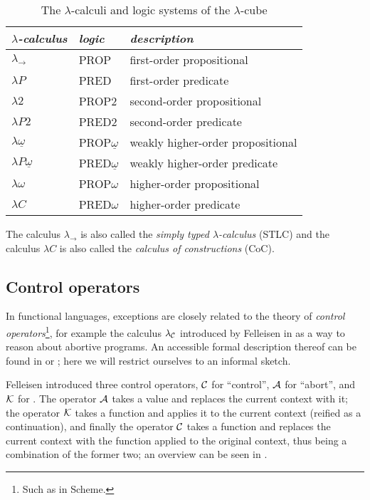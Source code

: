 \begin{table}
\centering
\begin{tabular}{lll}
\toprule
\textit{$\lambda$-calculus} & \textit{logic} & \textit{description} \\
\midrule
$\lambda_\to$ & PROP & first-order propositional \\
$\lambda{}P$ & PRED & first-order predicate \\
$\lambda{}2$ & PROP2 & second-order propositional \\
$\lambda{}P2$ & PRED2 & second-order predicate \\
$\lambda\underline{\omega}$ & PROP$\underline{\omega}$ & weakly higher-order propositional \\
$\lambda{}P\underline{\omega}$& PRED$\underline{\omega}$ & weakly higher-order predicate \\
$\lambda\omega$ & PROP$\omega$ & higher-order propositional \\
$\lambda{}C$ & PRED$\omega$ & higher-order predicate \\
\bottomrule
\end{tabular}

\vspace{6pt}
{\small The calculus $\lambda_\to$ is also called the \emph{simply typed $\lambda$-calculus} (STLC)
and the calculus $\lambda{}C$ is also called the \emph{calculus of constructions} (CoC).}
\caption{The $\lambda$-calculi and logic systems of the $\lambda$-cube \cite{barendregt91}}
\label{tab:lambda-cube}
\end{table}


\subsection{Control operators}

In functional languages, exceptions are closely related to the theory of
\emph{control operators}\footnote{Such as  in Scheme.},
for example the calculus $\lambda_{\mathcal{C}}$ introduced by Felleisen in \cite{felleisen87}
as a way to reason about abortive programs. An accessible formal description
thereof can be found in \cite[p.~876, Section~3]{ariola-herbelin} or
\cite{griffin90}; here we will restrict ourselves to an informal sketch.

Felleisen introduced three control operators, $\mathcal{C}$ for ``control'', $\mathcal{A}$
for ``abort'', and $\mathcal{K}$ for . The operator $\mathcal{A}$
takes a value and replaces the current context with it; the operator $\mathcal{K}$
takes a function and applies it to the current context (reified as a continuation),
and finally the operator $\mathcal{C}$ takes a function and replaces the current context
with the function applied to the original context, thus being a combination of
the former two; an overview can be seen in .

